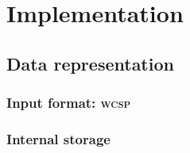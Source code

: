 \section{Implementation}
\subsection{Data representation}

\subsubsection{Input format: \textsc{wcsp}}


\subsubsection{Internal storage}
